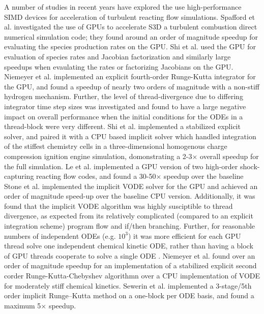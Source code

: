 \documentclass[preprint,12pt]{elsarticle}
\begin{document}
A number of studies in recent years have explored the use high-performance SIMD devices for acceleration of turbulent reacting flow simulations.
Spafford et al. \cite{Spafford:2010aa} investigated the use of GPUs to accelerate S3D \cite{CHEN:2009s3d} a turbulent combustion direct numerical simulation code; they found around an order of magnitude speedup for evaluating the species production rates on the GPU.
Shi et al. \cite{Shi:2011aa} used the GPU for evaluation of species rates and Jacobian factorization and similarly large speedups when evaulating the rates or factorizing Jacobians on the GPU.
Niemeyer et al. \cite{Niemeyer:2011aa} implemented an explicit fourth-order Runge-Kutta integrator for the GPU, and found a speedup of nearly two orders of magnitude with a non-stiff hydrogen mechanism.
Further, the level of thread-divergence due to differing integrator time step sizes was investigated and found to have a large negative impact on overall performance when the initial conditions for the ODEs in a thread-block were very different.
Shi et al. \cite{Shi:2012aa} implemented a stabilized explicit solver, and paired it with a CPU based implicit solver which handled integration of the stiffest chemistry cells in a three-dimensional homogenous charge compression ignition engine simulation, domonstrating a 2-3$\times$ overall speedup for the full simulation.
Le et al. \cite{Le2013596} implemented a GPU version of two high-order shock-capturing reacting flow codes, and found a 30-50$\times$ speedup over the baseline 
Stone et al. \cite{Stone:2013aa} implemented the implicit VODE \cite{brown1989vode} solver for the GPU and achieved an order of magnitude speed-up over the baseline CPU version.
Additionally, it was found that the implicit VODE algorithm was highly susciptible to thread divergence, as expected from its relatively complicated (compared to an explicit integration scheme) program flow and if/then branching.
Further, for reasonable numbers of independent ODEs (e.g. $\mathcal{10^3}$) it was more efficient for each GPU thread solve one independent chemical kinetic ODE, rather than having a block of GPU threads cooperate to solve a single ODE \cite{Stone:2013aa}.
Niemeyer et al. \cite{Niemeyer:2014aa} found over an order of magnitude speedup for an implementation of a stabilized explicit second corder Runge-Kutta-Chebyshev algorithmn over a CPU implementation of VODE for moderately stiff chemical kinetics.
Sewerin et al. \cite{Sewerin20151375} implemented a 3-stage/5th order implicit Runge--Kutta method \cite{hairer1996solving} on a one-block per ODE basis, and found a maximum 5$\times$ speedup.
\end{document}
